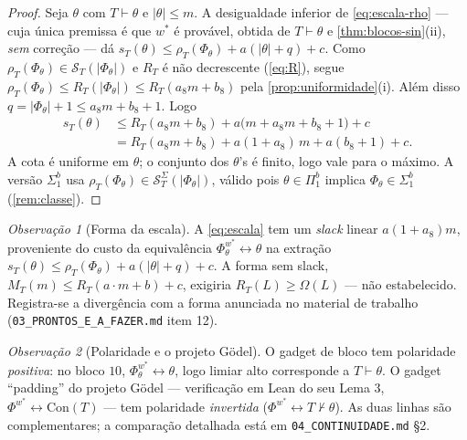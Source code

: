 \documentclass[11pt,a4paper]{article}
\theoremstyle{definition}
\theoremstyle{remark}
\newtheorem*{remark}{Observação}
\begin{document}
\begin{proof}
Seja $\theta$ com $T \vdash \theta$ e $\lvert\theta\rvert \leq m$. A
desigualdade inferior de \eqref{eq:escala-rho} --- cuja única premissa é que
$w^{*}$ é provável, obtida de $T \vdash \theta$ e
\cref{thm:blocos-sin}(ii), \emph{sem} correção --- dá
$s_T(\theta) \leq \rho_T(\Phi_\theta) + a(\lvert\theta\rvert+q)+c$. Como
$\rho_T(\Phi_\theta) \in \mathcal{S}_T(\lvert\Phi_\theta\rvert)$ e $R_T$ é não
decrescente (\eqref{eq:R}), segue
$\rho_T(\Phi_\theta) \leq R_T(\lvert\Phi_\theta\rvert)
\leq R_T(a_{8} m + b_{8})$ pela \cref{prop:uniformidade}(i). Além disso
$q = \lvert\Phi_\theta\rvert + 1 \leq a_{8} m + b_{8} + 1$. Logo
\begin{align*}
  s_T(\theta) &\leq R_T(a_{8} m + b_{8})
    + a\bigl(m + a_{8} m + b_{8} + 1\bigr) + c \\
              &= R_T(a_{8} m + b_{8}) + a(1+a_{8})\,m + a(b_{8}+1) + c .
\end{align*}
A cota é uniforme em $\theta$; o conjunto dos $\theta$'s é finito, logo vale
para o máximo. A versão $\Sigma^{b}_{1}$ usa
$\rho_T(\Phi_\theta) \in \mathcal{S}^{\Sigma}_T(\lvert\Phi_\theta\rvert)$,
válido pois $\theta \in \Pi^{b}_{1}$ implica $\Phi_\theta \in \Sigma^{b}_{1}$
(\cref{rem:classe}).
\end{proof}

\begin{remark}[Forma da escala]\label{rem:escala-forma}
A \cref{eq:escala} tem um \emph{slack} linear $a(1+a_{8})m$, proveniente do
custo da equivalência $\Phi_\theta^{w^{*}} \leftrightarrow \theta$ na extração
$s_T(\theta) \leq \rho_T(\Phi_\theta) + a(\lvert\theta\rvert+q)+c$. A forma sem
slack, $M_T(m) \leq R_T(a \cdot m + b) + c$, exigiria
$R_T(L) \geq \Omega(L)$ --- não estabelecido. Registra-se a divergência com a
forma anunciada no material de trabalho
(\texttt{03\_PRONTOS\_E\_A\_FAZER.md} item 12).
\end{remark}

\begin{remark}[Polaridade e o projeto G\"{o}del]\label{rem:polaridade}
O gadget de bloco tem polaridade \emph{positiva}: no bloco $10$,
$\Phi_\theta^{w^{*}} \leftrightarrow \theta$, logo limiar alto corresponde a
$T \vdash \theta$. O gadget ``padding'' do projeto Gödel --- verificação em
Lean do seu Lema 3, $\Phi^{w^{*}} \leftrightarrow \mathrm{Con}(T)$ --- tem
polaridade \emph{invertida} ($\Phi^{w^{*}} \leftrightarrow T \nvdash \theta$).
As duas linhas são complementares; a comparação detalhada está em
\texttt{04\_CONTINUIDADE.md} §2.
\end{remark}
\end{document}
